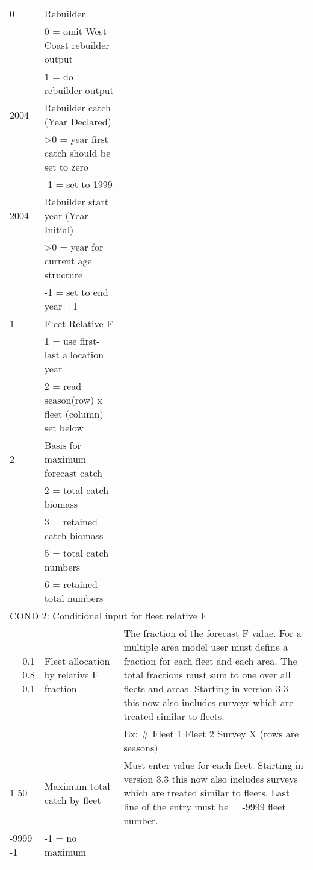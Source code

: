 \begin{landscape}
\begin{longtable}{p{3cm} p{7cm} p{11cm}}
 \hline
 0 & Rebuilder & \\
   & 0 = omit West Coast rebuilder output & \\
   & 1 = do rebuilder output & \\
   
 \hline
 2004 & Rebuilder catch (Year Declared) & \\
      & >0 = year first catch should be set to zero & \\
      & -1 = set to 1999 & \\
      
 \hline
 2004 & Rebuilder start year (Year Initial) & \\
      & >0 = year for current age structure & \\
      & -1 = set to end year +1 & \\
      
 \hline
 1 & Fleet Relative F & \\
   & 1 = use first-last allocation year & \\
   & 2 = read season(row) x fleet (column) set below & \\
   
 \pagebreak %

 2 & Basis for maximum forecast catch &  \\
   & 2 = total catch biomass & \\
   & 3 = retained catch biomass & \\
   & 5 = total catch numbers & \\
   & 6 = retained total numbers & \\
 
 \hline  
 \multicolumn{3}{l}{COND 2: Conditional input for fleet relative F} \\
 \multicolumn{1}{r}{0.1 0.8 0.1}  & Fleet allocation by relative F fraction & The fraction of the forecast F value.  For a multiple area model user must define a fraction for each fleet and each area.  The total fractions must sum to one over all fleets and areas.  Starting in version 3.3 this now also includes surveys which are treated similar to fleets.\\
   &  &  Ex: \# Fleet 1  Fleet 2  Survey X (rows are seasons)\\ 
 
  \hline
  1 50 & Maximum total catch by fleet & \multirow{1}{1cm}[-0.1cm]{\parbox{11cm}{Must enter value for each fleet.  Starting in version 3.3 this now also includes surveys which are treated similar to fleets. Last line of the entry must be = -9999 fleet number.}} \\
  -9999 -1 & -1 = no maximum & \\
	   & & \\
  

\end{longtable}
\end{landscape}
